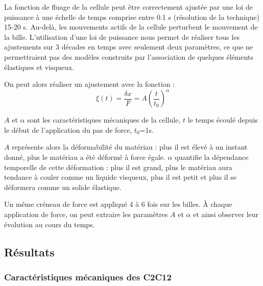 	 
La fonction de fluage de la cellule peut être correctement ajustée par une loi de puissance à une échelle de temps comprise entre 0.1 s (résolution de la technique) 15-20 s. Au-delà, les mouvements actifs de la cellule perturbent le mouvement de la bille.  
L'utilisation d'une loi de puissance nous permet de réaliser tous les ajustements sur 3 décades en temps avec seulement deux paramètres, ce que ne permettraient pas des modèles construits par l’association de quelques éléments élastiques et visqueux. 

On peut alors réaliser un ajustement avec la fonction : 
$$ \xi (t) = \frac{\delta x}{F}=A \left( \frac{t}{t_0} \right)^{\alpha}$$

$A$ et $\alpha$ sont les caractéristiques mécaniques de la cellule, $t$ le temps écoulé depuis le début de l'application du pas de force, $t_0$=1s. 

% 
 
 $A$ représente alors la déformabilité du matériau : plus il est élevé à un instant donné, plus le matériau a été déformé à force égale. 
 $\alpha$ quantifie la dépendance temporelle de cette déformation : plus il est grand, plus le matériau aura tendance à couler comme un liquide visqueux, plus il est petit et plus il se déformera comme un solide élastique. 

Un même créneau de force est appliqué 4 à 6 fois sur les billes. 
À chaque application de force, on peut extraire les paramètres $A$ et $\alpha$ et ainsi observer leur évolution au cours du temps. 


\subsection{Résultats}



\subsubsection{Caractéristiques mécaniques des C2C12}

